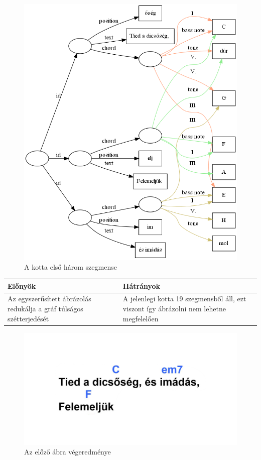 \begin{figure}[h]
	\includegraphics[scale=0.45]{images/img_src/representation_of_sheet.png}
	\caption{A kotta első három szegmense}
	\label{fig:repres1}
\end{figure}

\begin{center}
	\begin{tabular}{ |p{7cm}|p{7cm}| }
		\hline
		Előnyök & Hátrányok\\
		\hline
		Az egyszerűsített ábrázolás redukálja a gráf túlságos szétterjedését & A jelenlegi kotta 19 szegmensből áll, ezt viszont így ábrázolni nem lehetne megfelelően \\ 
		\hline
	\end{tabular}
\end{center}

\begin{figure}[h]
	\includegraphics[scale=0.26]{images/representated_sheet.png}
	\caption{Az előző ábra végeredménye}
	\label{fig:repres2}
\end{figure}


